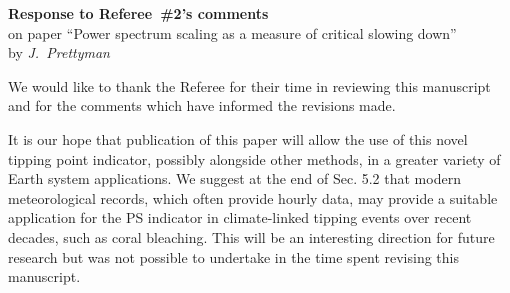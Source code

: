 \documentclass[12pt, a4paper]{article}
\begin{document}
\begin{center}
{\bf Response to Referee~\#2's comments}\\
on paper ``Power spectrum scaling as a measure of critical slowing down''\\[5pt]
by {\it J.~Prettyman}
\end{center}

\vspace{3mm}

\noindent We would like to thank the Referee for their time in reviewing this manuscript and for the comments which have informed the revisions made. 

It is our hope that publication of this paper will allow the use of this novel tipping point indicator, possibly alongside other methods, in a greater variety of Earth system applications. We suggest at the end of Sec. 5.2 that modern meteorological records, which often provide hourly data, may provide a suitable application for the PS indicator in climate-linked tipping events over recent decades, such as coral bleaching. This will be an interesting direction for future research but was not possible to undertake in the time spent revising this manuscript. 
\end{document}
